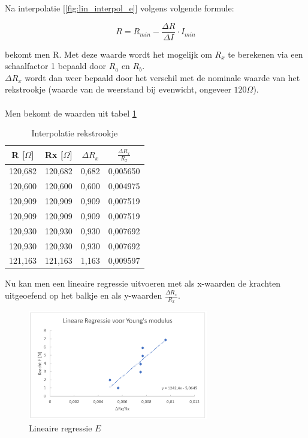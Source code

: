 Na interpolatie [\ref{fig:lin_interpol_e}] volgens volgende formule:

\begin{equation}
    R = R_{min} - \frac{\Delta R}{\Delta I} \cdot I_{min}
\end{equation}


bekomt men R. Met deze waarde wordt het mogelijk om $R_{x}$ te
berekenen via een schaalfactor 1 bepaald door $R_{a}$ en $R_{b}$.
\\

$\Delta R_{x}$ wordt dan weer bepaald door het verschil met de
nominale waarde van het rekstrookje (waarde van de weerstand
bij evenwicht, ongeveer $120\Omega$).
\\ \\
Men bekomt de waarden uit tabel \ref{tab:interpol_rekstrookje}

\begin{table}[h]
    \centering
    \caption{Interpolatie rekstrookje}
    \label{tab:interpol_rekstrookje}
    \begin{tabular}{| c | c | c | c |}
        \hline
        R [$\Omega$]    & Rx [$\Omega$] & $\Delta R_{x}$    & $\frac{\Delta R_{x}}{R_{x}}$ \\ \hline
        120,682         & 120,682       & 0,682             & 0,005650 \\ \hline
        120,600         & 120,600       & 0,600             & 0,004975 \\ \hline
        120,909         & 120,909       & 0,909             & 0,007519 \\ \hline
        120,909         & 120,909       & 0,909             & 0,007519 \\ \hline
        120,930         & 120,930       & 0,930             & 0,007692 \\ \hline
        120,930         & 120,930       & 0,930             & 0,007692 \\ \hline
        121,163         & 121,163       & 1,163             & 0,009597 \\ \hline
    \end{tabular}
\end{table}

Nu kan men een lineaire regressie uitvoeren met als x-waarden
de krachten uitgeoefend op het balkje en als y-waarden
$\frac{\Delta R_{x}}{R_{x}}$.

\begin{figure}[h]
    \centering
    \caption{Lineaire regressie $E$}
    \label{fig:lin_reg_E}
    \includegraphics[width=0.7\textwidth]{img/grafiek.png}
\end{figure}

